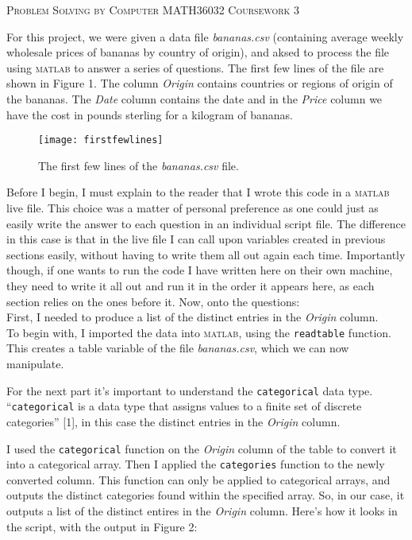 \documentclass[a4paper,12pt]{article}
\begin{document}
\begin{center}
\Large\textsc{Problem Solving by Computer MATH36032}
\Large\textsc{Coursework 3}
\end{center}

For this project, we were given a data file \textit{bananas.csv} (containing average weekly wholesale prices of bananas by country of origin), and aksed to process the file using \textsc{matlab} to answer a series of questions. The first few lines of the file are shown in Figure 1. The column \textit{Origin} contains countries or regions of origin of the bananas. The \textit{Date} column contains the date and in the \textit{Price} column we have the cost in pounds sterling for a kilogram of bananas.

\begin{figure}[h]
\centering
\texttt{[image: firstfewlines]}
\caption{The first few lines of the \textit{bananas.csv} file.}
\end{figure}

Before I begin, I must explain to the reader that I wrote this code in a \textsc{matlab} live file. This choice was a matter of personal preference as one could just as easily write the answer to each question in an individual script file. The difference in this case is that in the live file I can call upon variables created in previous sections easily, without having to write them all out again each time. Importantly though, if one wants to run the code I have written here on their own machine, they need to write it all out and run it in the order it appears here, as each section relies on the ones before it. Now, onto the questions: \\

First, I needed to produce a list of the distinct entries in the \textit{Origin} column. \\

To begin with, I imported the data into \textsc{matlab}, using the \verb!readtable! function. This creates a table variable of the file \textit{bananas.csv}, which we can now manipulate.

For the next part it's important to understand the \verb!categorical! data type. ``\verb!categorical! is a data type that assigns values to a finite set of discrete categories'' [1], in this case the distinct entries in the \textit{Origin} column.

I used the \verb!categorical! function on the \textit{Origin} column of the table to convert it into a categorical array. Then I applied the \verb!categories! function to the newly converted column. This function can only be applied to categorical arrays, and outputs the distinct categories found within the specified array. So, in our case, it outputs a list of the distinct entires in the \textit{Origin} column. Here's how it looks in the script, with the output in Figure 2:
\end{document}
